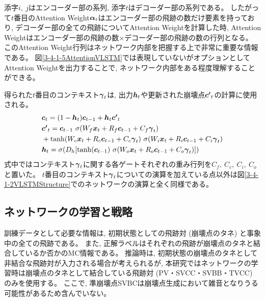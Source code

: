 添字$i,\ j$はエンコーダー部の系列, 添字$t$はデコーダー部の系列である。
したがって$t$番目のAttention Weight${\mbox{\boldmath{$\alpha$}}}_{t}$はエンコーダー部の飛跡の数だけ要素を持っており, デコーダー部の全ての飛跡についてAttention Weightを計算した時, Attention Weightはエンコーダー部の飛跡の数$\times$デコーダー部の飛跡の数の行列となる。
このAttention Weight行列はネットワーク内部を把握する上で非常に重要な情報である。
図\ref{3-4-1-5AttentionVLSTM}では表現していないがオプションとしてAttention Weightを出力することで, ネットワーク内部をある程度理解することができる。

得られた$t$番目のコンテキスト${\mbox{\boldmath{$\gamma$}}}_{t}$は, 出力${\mbox{\boldmath{$h$}}}_{t}$や更新された崩壊点${\mbox{\boldmath{$c'$}}}_{t}$の計算に使用される。
\begin{equation}
 \begin{split}
  &{\mbox{\boldmath{$c$}}}_{t} 
  = (1-{\mbox{\boldmath{$h$}}}_t) {\mbox{\boldmath{$c$}}}_{t-1} + {\mbox{\boldmath{$h$}}}_t {\mbox{\boldmath{$c'$}}}_{t}\\
  &{\mbox{\boldmath{$c'$}}}_{t}
  = {\mbox{\boldmath{$c$}}}_{t-1} \  \sigma (W_f {\mbox{\boldmath{$x$}}}_t + R_f {\mbox{\boldmath{$c$}}}_{t-1} + C_f {\mbox{\boldmath{$\gamma$}}}_{t})\\
  &+ \tanh (W_c {\mbox{\boldmath{$x$}}}_t + R_c {\mbox{\boldmath{$c$}}}_{t-1} + C_c {\mbox{\boldmath{$\gamma$}}}_{t}) \  \sigma (W_i {\mbox{\boldmath{$x$}}}_t + R_i {\mbox{\boldmath{$c$}}}_{t-1} + C_i {\mbox{\boldmath{$\gamma$}}}_{t})\\
  &{\mbox{\boldmath{$h$}}}_{t} 
  = \sigma (D_h [\tanh({\mbox{\boldmath{$c$}}}_{t-1}) \  \sigma (W_o {\mbox{\boldmath{$x$}}}_t + R_o {\mbox{\boldmath{$c$}}}_{t-1} + C_o {\mbox{\boldmath{$\gamma$}}}_{t}) ])
 \end{split}
\end{equation}
式中ではコンテキスト${\mbox{\boldmath{$\gamma$}}}_{t}$に関する各ゲートそれぞれの重み行列を$C_f,\ C_c,\ C_i,\ C_o$と置いた。
$t$番目のコンテキスト${\mbox{\boldmath{$\gamma$}}}_{t}$についての演算を加えている点以外は図\ref{3-4-1-2VLSTMStructure}でのネットワークの演算と全く同様である。


\subsection{ネットワークの学習と戦略} \label{Net:VLSTM:TrainingandStrategyofVLSTM}

訓練データとして必要な情報は, 初期状態としての飛跡対 (崩壊点のタネ) と事象中の全ての飛跡である。
また, 正解ラベルはそれぞれの飛跡が崩壊点のタネと結合しているか否かのMC情報である。
推論時は, 初期状態の崩壊点のタネとして非結合な飛跡対が入力される場合が考えられるが, 本研究ではネットワークの学習時は崩壊点のタネとして結合している飛跡対 (PV・SVCC・SVBB・TVCC) のみを使用する。
ここで, 準崩壊点SVBCは崩壊点生成において雑音となりうる可能性があるため含んでいない。

